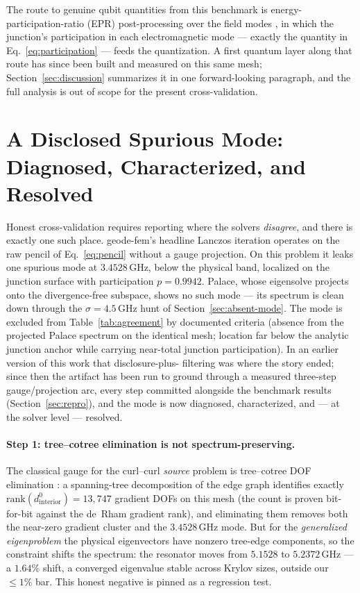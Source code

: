 \documentclass{anvil-paper}
\begin{document}
The route to genuine qubit quantities from this benchmark is
energy-participation-ratio (EPR) post-processing over the field modes
\citep{minev2021,nigg2012}, in which the junction's participation in each
electromagnetic mode --- exactly the quantity in
Eq.~\ref{eq:participation} --- feeds the quantization. A first quantum
layer along that route has since been built and measured on this same
mesh; Section~\ref{sec:discussion} summarizes it in one forward-looking
paragraph, and the full analysis is out of scope for the present
cross-validation.

\section{A Disclosed Spurious Mode: Diagnosed, Characterized, and Resolved}
\label{sec:spurious-mode}

Honest cross-validation requires reporting where the solvers
\emph{disagree}, and there is exactly one such place. geode-fem's headline
Lanczos iteration operates on the raw pencil of Eq.~\ref{eq:pencil}
without a gauge projection. On this problem it leaks one spurious mode at
$3.4528$\,GHz, below the physical band, localized on the junction surface
with participation $p = 0.9942$. Palace, whose eigensolve projects onto
the divergence-free subspace, shows no such mode --- its spectrum is clean
down through the $\sigma = 4.5$\,GHz hunt of
Section~\ref{sec:absent-mode}. The mode is excluded from
Table~\ref{tab:agreement} by documented criteria (absence from the
projected Palace spectrum on the identical mesh; location far below the
analytic junction anchor while carrying near-total junction
participation). In an earlier version of this work that disclosure-plus-
filtering was where the story ended; since then the artifact has been
run to ground through a measured three-step gauge/projection arc, every
step committed alongside the benchmark results
(Section~\ref{sec:repro}), and the mode is now diagnosed, characterized,
and --- at the solver level --- resolved.

\paragraph{Step 1: tree--cotree elimination is not spectrum-preserving.}
The classical gauge for the curl--curl \emph{source} problem is
tree--cotree DOF elimination
\citep{albanese1988solution,manges1995generalized}: a spanning-tree
decomposition of the edge graph identifies exactly
$\mathrm{rank}(d^0_{\mathrm{interior}}) = 13{,}747$ gradient DOFs on this
mesh (the count is proven bit-for-bit against the de~Rham gradient rank),
and eliminating them removes both the near-zero gradient cluster and the
$3.4528$\,GHz mode. But for the \emph{generalized eigenproblem} the
physical eigenvectors have nonzero tree-edge components, so the constraint
shifts the spectrum: the resonator moves from $5.1528$ to $5.2372$\,GHz
--- a $1.64\%$ shift, a converged eigenvalue stable across Krylov sizes,
outside our $\leq 1\%$ bar. This honest negative is pinned as a regression
test.
\end{document}
